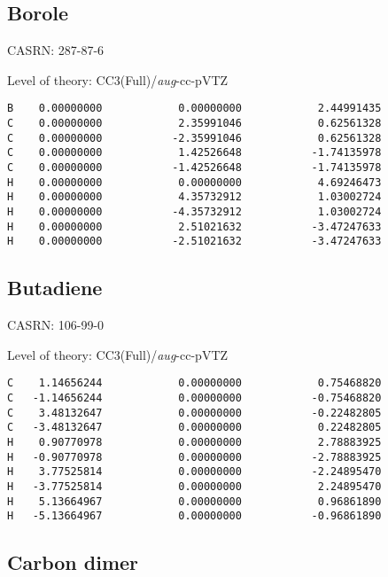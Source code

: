 \documentclass[journal=jctcce,manuscript=article,layout=traditional]{achemso}
\newcommand{\AVTZ}{\emph{aug}-cc-pVTZ}
\begin{document}
\subsection{Borole}

CASRN: 287-87-6 

\begin{singlespace}
\noindent  Level of theory: CC3(Full)/{\AVTZ}
\begin{verbatim}
B    0.00000000            0.00000000            2.44991435
C    0.00000000            2.35991046            0.62561328
C    0.00000000           -2.35991046            0.62561328
C    0.00000000            1.42526648           -1.74135978
C    0.00000000           -1.42526648           -1.74135978
H    0.00000000            0.00000000            4.69246473
H    0.00000000            4.35732912            1.03002724
H    0.00000000           -4.35732912            1.03002724
H    0.00000000            2.51021632           -3.47247633
H    0.00000000           -2.51021632           -3.47247633
\end{verbatim}
\end{singlespace}

\subsection{Butadiene}

CASRN: 106-99-0

\begin{singlespace}
\noindent  Level of theory: CC3(Full)/{\AVTZ}
\begin{verbatim}
C    1.14656244            0.00000000            0.75468820
C   -1.14656244            0.00000000           -0.75468820
C    3.48132647            0.00000000           -0.22482805
C   -3.48132647            0.00000000            0.22482805 
H    0.90770978            0.00000000            2.78883925 
H   -0.90770978            0.00000000           -2.78883925 
H    3.77525814            0.00000000           -2.24895470 
H   -3.77525814            0.00000000            2.24895470 
H    5.13664967            0.00000000            0.96861890 
H   -5.13664967            0.00000000           -0.96861890 
\end{verbatim}
\end{singlespace}

\subsection{Carbon dimer}
\end{document}
